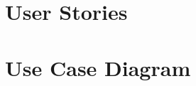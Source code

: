 \section{User Stories}
\label{section:user-stories}










\section{Use Case Diagram}
\label{section:use-case-diagram}

